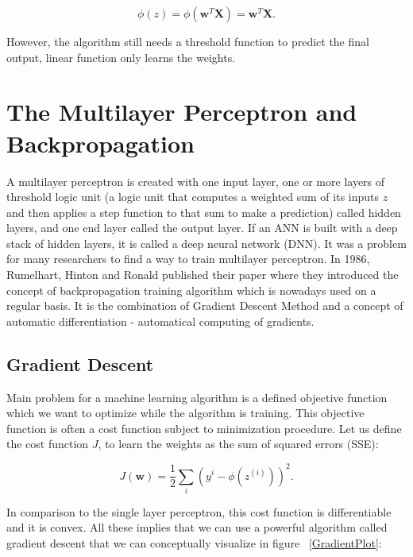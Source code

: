 \documentclass[a4paper,oneside,openright,11pt]{book}
\begin{document}
\begin{equation}
    \phi(z) =  \phi(\textbf{w}^{T} \textbf{X}) = \textbf{w}^{T} \textbf{X}.
\end{equation}

However, the algorithm still needs  a threshold function to predict the final output, linear function only learns the weights.

\section{The Multilayer Perceptron and Backpropagation}

A multilayer perceptron is created with one input layer, one or more layers of threshold logic unit (a logic unit that computes a weighted sum of its inputs $z$ and then applies a step function to that sum to make a prediction) called hidden layers, and one end layer called the output layer. If an ANN is built with a deep stack of hidden layers, it is called a deep neural network (DNN). It was a problem for many researchers to find a way to train multilayer perceptron. In 1986, Rumelhart, Hinton and Ronald published their paper \cite{rumelhart1985learning} where they introduced the concept of backpropagation training algorithm which is nowadays used on a regular basis. It is the combination of Gradient Descent Method and a concept of automatic differentiation - automatical computing of gradients.


\subsection{Gradient Descent}

Main problem for a machine learning algorithm is a defined objective function which we want to optimize while the algorithm is training. This objective function is often a cost function subject to minimization procedure. Let us define the cost function $J$, to learn the weights as the sum of squared errors (SSE):

\begin{equation}
    J(\textbf{w}) = \frac{1}{2}\sum_{i}^{}(y^{i} - \phi(z^{(i)}))^{2}.
\end{equation}

In comparison to the single layer perceptron, this cost function is differentiable and it is convex. All these implies that we can use a powerful algorithm called gradient descent that we can conceptually visualize in figure ~\ref{GradientPlot}:
\end{document}
